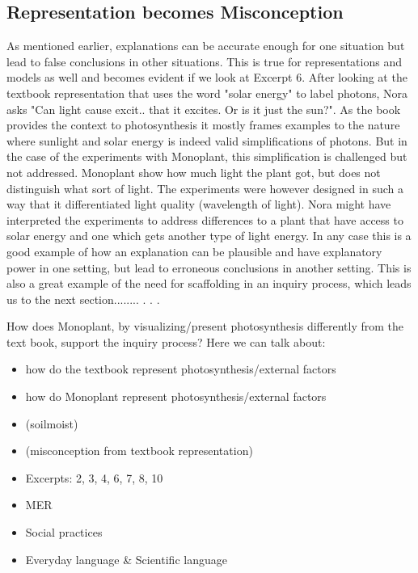 \subsection{Representation becomes Misconception}
As mentioned earlier, explanations can be accurate enough for one situation but lead to false conclusions in other situations. \citep{smith1994misconceptions} This is true for representations and models as well and becomes evident if we look at Excerpt 6. After looking at the textbook representation that uses the word "solar energy" to label photons, Nora asks "Can light cause excit.. that it excites. Or is it just the sun?". As the book provides the context to photosynthesis it mostly frames examples to the nature where sunlight and solar energy is indeed valid simplifications of photons. But in the case of the experiments with Monoplant, this simplification is challenged but not addressed. Monoplant show how much light the plant got, but does not distinguish what sort of light. The experiments were however designed in such a way that it differentiated light quality (wavelength of light). Nora might have interpreted the experiments to address differences to a plant that have access to solar energy and one which gets another type of light energy. In any case this is a good example of how an explanation can be plausible and have explanatory power in one setting, but lead to erroneous conclusions in another setting. This is also a great example of the need for scaffolding in an inquiry process, which leads us to the next section........ . . . 









How does Monoplant, by visualizing/present photosynthesis differently from the text book, support the inquiry process? 
Here we can talk about: 
\begin{itemize}
\item{how do the textbook represent photosynthesis/external factors}
\item{how do Monoplant represent photosynthesis/external factors}
\item{ (soilmoist)}
\item{ (misconception from textbook representation)}
\item{Excerpts: 2, 3, 4, 6, 7, 8, 10}
\item{MER}
\item{Social practices}
\item{Everyday language \& Scientific language}
\end{itemize}




